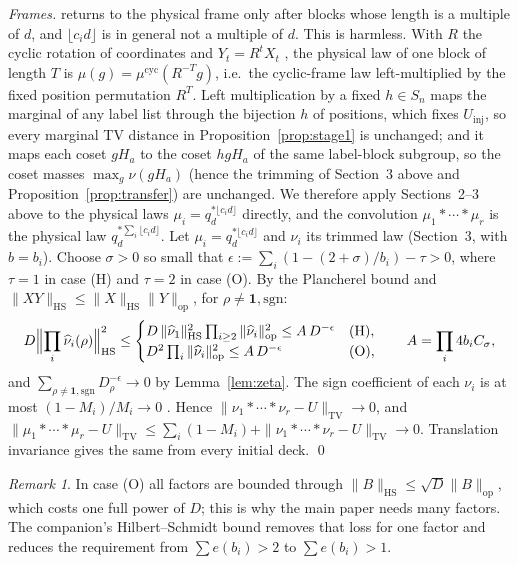 \documentclass[11pt]{amsart}
\theoremstyle{remark}
\newtheorem{remark}[theorem]{Remark}
\newcommand{\TV}{\mathrm{TV}}
\newcommand{\HS}{\mathrm{HS}}
\newcommand{\op}{\mathrm{op}}
\begin{document}
\emph{Frames.} \cite[Section~2]{oai-thorp} returns to the physical frame only after blocks whose length
is a multiple of $d$, and $\lfloor c_id\rfloor$ is in general not a multiple of $d$. This is harmless.
With $R$ the cyclic rotation of coordinates and $Y_t=R^tX_t$ \cite[Section~2]{oai-thorp}, the physical
law of one block of length $T$ is $\mu(g)=\mu^{\mathrm{cyc}}(R^{-T}g)$, i.e.\ the cyclic-frame law
left-multiplied by the fixed position permutation $R^T$. Left multiplication by a fixed $h\in S_n$ maps
the marginal of any label list through the bijection $h$ of positions, which fixes $U_{\mathrm{inj}}$, so
every marginal TV distance in Proposition~\ref{prop:stage1} is unchanged; and it maps each coset
$gH_a$ to the coset $hgH_a$ of the same label-block subgroup, so the coset masses $\max_g\nu(gH_a)$
(hence the trimming of Section~3 above and Proposition~\ref{prop:transfer}) are unchanged. We therefore
apply Sections~2--3 above to the physical laws $\mu_i=q_d^{*\lfloor c_id\rfloor}$ directly, and the
convolution $\mu_1*\cdots*\mu_r$ is the physical law $q_d^{*\sum_i\lfloor c_id\rfloor}$. Let $\mu_i=q_d^{*\lfloor c_id\rfloor}$ and $\nu_i$ its trimmed law (Section~3,
with $b=b_i$). Choose $\sigma>0$ so small that $\epsilon:=\sum_i(1-(2+\sigma)/b_i)-\tau>0$, where
$\tau=1$ in case (H) and $\tau=2$ in case (O). By the Plancherel bound \cite[(7.1)]{oai-thorp} and
$\|XY\|_{\HS}\le\|X\|_{\HS}\|Y\|_{\op}$, for $\rho\ne\mathbf 1,\mathrm{sgn}$:
\[
D\Bigl\|\prod_i\widehat\nu_i(\rho)\Bigr\|_{\HS}^2\le
\begin{cases}
D\,\|\widehat\nu_1\|_{\HS}^2\prod_{i\ge2}\|\widehat\nu_i\|_{\op}^2\le A\,D^{-\epsilon}&\text{(H)},\\
D^2\prod_i\|\widehat\nu_i\|_{\op}^2\le A\,D^{-\epsilon}&\text{(O)},
\end{cases}
\qquad A=\prod_i4b_iC_\sigma,
\]
and $\sum_{\rho\ne\mathbf 1,\mathrm{sgn}}D_\rho^{-\epsilon}\to0$ by Lemma~\ref{lem:zeta}. The sign
coefficient of each $\nu_i$ is at most $(1-M_i)/M_i\to0$ \cite[Section~7]{oai-thorp}. Hence
$\|\nu_1*\cdots*\nu_r-U\|_{\TV}\to0$, and
$\|\mu_1*\cdots*\mu_r-U\|_{\TV}\le\sum_i(1-M_i)+\|\nu_1*\cdots*\nu_r-U\|_{\TV}\to0$.
Translation invariance gives the same from every initial deck. \qed

\begin{remark}
In case (O) all factors are bounded through $\|B\|_{\HS}\le\sqrt D\|B\|_{\op}$, which costs one full
power of $D$; this is why the main paper needs many factors. The companion's Hilbert--Schmidt bound
removes that loss for one factor and reduces the requirement from $\sum e(b_i)>2$ to $\sum e(b_i)>1$.
\end{remark}
\end{document}
